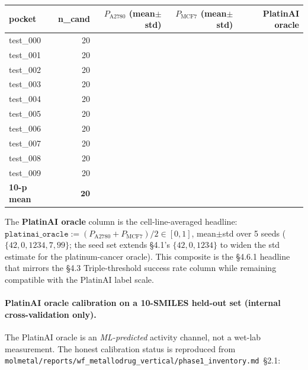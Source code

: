 \begin{center}
\small
\setlength{\tabcolsep}{4pt}
\begin{tabular}{l rrr r}
\toprule
\textbf{pocket} & \textbf{n\_cand} & \textbf{$P_{\text{A2780}}$ (mean$\pm$std)} & \textbf{$P_{\text{MCF7}}$ (mean$\pm$std)} & \textbf{PlatinAI oracle} \\
\midrule
test\_000 & 20 & \DESIGN{} & \DESIGN{} & \DESIGN{} \\
test\_001 & 20 & \DESIGN{} & \DESIGN{} & \DESIGN{} \\
test\_002 & 20 & \DESIGN{} & \DESIGN{} & \DESIGN{} \\
test\_003 & 20 & \DESIGN{} & \DESIGN{} & \DESIGN{} \\
test\_004 & 20 & \DESIGN{} & \DESIGN{} & \DESIGN{} \\
test\_005 & 20 & \DESIGN{} & \DESIGN{} & \DESIGN{} \\
test\_006 & 20 & \DESIGN{} & \DESIGN{} & \DESIGN{} \\
test\_007 & 20 & \DESIGN{} & \DESIGN{} & \DESIGN{} \\
test\_008 & 20 & \DESIGN{} & \DESIGN{} & \DESIGN{} \\
test\_009 & 20 & \DESIGN{} & \DESIGN{} & \DESIGN{} \\
\midrule
\textbf{10-p mean} & $\mathbf{20}$ & \DESIGN{} & \DESIGN{} & \DESIGN{} \\
\bottomrule
\end{tabular}
\end{center}

\noindent The \textbf{PlatinAI oracle} column is the
cell-line-averaged headline:
$\texttt{platinai\_oracle} := (P_{\text{A2780}} + P_{\text{MCF7}})/2
\in [0, 1]$, mean$\pm$std over 5 seeds
($\{42, 0, 1234, 7, 99\}$; the seed set extends §4.1's
$\{42, 0, 1234\}$ to widen the std estimate for the
platinum-cancer oracle). This composite is the §4.6.1
headline that mirrors the §4.3
Triple-threshold success rate column while remaining
compatible with the PlatinAI label scale.

\paragraph{PlatinAI oracle calibration on a 10-SMILES
held-out set (internal cross-validation only).}
The PlatinAI oracle is an \emph{ML-predicted} activity
channel, not a wet-lab measurement. The honest
calibration status is reproduced from
\texttt{molmetal/reports/wf\_metallodrug\_vertical/phase1\_inventory.md}~\S2.1:

